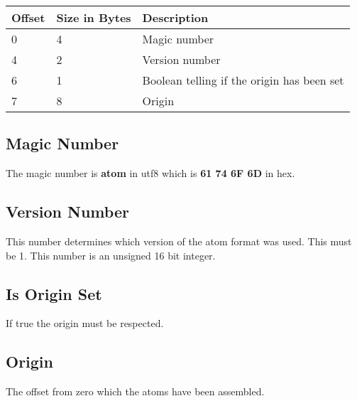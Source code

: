 \begin{table}[h]
    \centering
    \label{tbl:header}
    \begin{tabular}{|l|l|l|}
        \hline
        \textbf{Offset} & \textbf{Size in Bytes} & \textbf{Description}                         \\ \hline
        0               & 4                      & Magic number                                 \\ \hline
        4               & 2                      & Version number                               \\ \hline
        6               & 1                      & Boolean telling if the origin has been set   \\ \hline
        7               & 8                      & Origin                                       \\ \hline
    \end{tabular}
\end{table}

\subsection{Magic Number}
The magic number is \textbf{atom} in utf8 which is \textbf{61 74 6F 6D} in hex.

\subsection{Version Number}
This number determines which version of the atom format was used. This must be 
1. This number is an unsigned 16 bit integer.

\subsection{Is Origin Set}
If true the origin must be respected.

\subsection{Origin}
The offset from zero which the atoms have been assembled.
